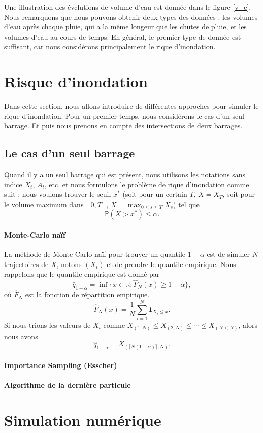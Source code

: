 \documentclass{article}
\begin{document}
Une illustration des évclutions de volume d'eau est donnée dans le figure \ref{v_e}. Nous remarquons que nous pouvons obtenir deux types des données : les volumes d'eau après chaque pluie, qui a la même longeur que les chutes de pluie, et les volumes d'eau au cours de temps. En général, le premier type de donnée est suffisant, car nous considérons principalement le rique d'inondation.

\section{Risque d'inondation}
Dans cette section, nous allons introduire de différentes approches pour simuler le rique d'inondation. Pour un premier temps, nous considérons le cas d'un seul barrage. Et puis nous prenons en compte des intersections de deux barrages.
\subsection{Le cas d'un seul barrage}
Quand il y a un seul barrage qui est présent, nous utilisons les notations sans indice $X_t$, $A_t$, etc. et nous formulons le problème de rique d'inondation comme suit : nous voulons trouver le seuil $x^\ast$ (soit pour un certain $T$, $X=X_T$, soit pour le volume maximum dans $[0,T]$, $X=\max_{0\le s\le T}X_s$) tel que
\[\mathbb{P}(X>x^\ast)\leq \alpha.\]
\paragraph{Monte-Carlo naïf} La méthode de Monte-Carlo naïf pour trouver un quantile $1-\alpha$ est de simuler $N$ trajectoires de $X$, notons $(X_i)$ et de prendre le quantile empirique. Nous rappelons que le quantile empirique est donné par
\[\hat{q}_{1-\alpha} = \inf\{x\in \mathbb{R}:\hat{F}_N(x)\geq 1-\alpha\},\]
où $\hat{F}_N$ est la fonction de répartition empirique. 
\[ \hat{F}_N(x) = \frac{1}{N}\sum_{i=1}^N \mathbf{1}_{X_i\leq x}.\]
Si nous trions les valeurs de $X_i$ comme $X_{(1,N)}\leq X_{(2,N)}\leq \cdots \leq X_{(N<N)}$, alors nous avons
\[\hat{q}_{1-\alpha} = X_{(\lceil N(1-\alpha)\rceil,N)}.\]
\paragraph{Importance Sampling (Esscher)}
\paragraph{Algorithme de la dernière particule}
\section{Simulation numérique} 
\end{document}
